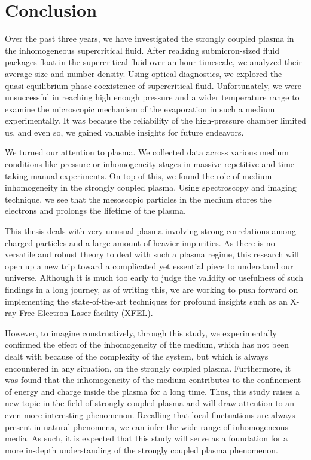 
\chapter{Conclusion}
\label{sec:ch5}

Over the past three years, we have investigated the strongly coupled plasma in the inhomogeneous supercritical fluid. After realizing submicron-sized fluid packages float in the supercritical fluid over an hour timescale, we analyzed their average size and number density. Using optical diagnostics, we explored the quasi-equilibrium phase coexistence of supercritical fluid. Unfortunately, we were unsuccessful in reaching high enough pressure and a wider temperature range to examine the microscopic mechanism of the evaporation in such a medium experimentally. It was because the reliability of the high-pressure chamber limited us, and even so, we gained valuable insights for future endeavors.

We turned our attention to plasma. We collected data across various medium conditions like pressure or inhomogeneity stages in massive repetitive and time-taking manual experiments. On top of this, we found the role of medium inhomogeneity in the strongly coupled plasma. Using spectroscopy and imaging technique, we see that the mesoscopic particles in the medium stores the electrons and prolongs the lifetime of the plasma.

This thesis deals with very unusual plasma involving strong correlations among charged particles and a large amount of heavier impurities. As there is no versatile and robust theory to deal with such a plasma regime, this research will open up a new trip toward a complicated yet essential piece to understand our universe. Although it is much too early to judge the validity or usefulness of such findings in a long journey, as of writing this, we are working to push forward on implementing the state-of-the-art techniques for profound insights such as an X-ray Free Electron Laser facility (XFEL).

However, to imagine constructively, through this study, we experimentally confirmed the effect of the inhomogeneity of the medium, which has not been dealt with because of the complexity of the system, but which is always encountered in any situation, on the strongly coupled plasma. Furthermore, it was found that the inhomogeneity of the medium contributes to the confinement of energy and charge inside the plasma for a long time. Thus, this study raises a new topic in the field of strongly coupled plasma and will draw attention to an even more interesting phenomenon. Recalling that local fluctuations are always present in natural phenomena, we can infer the wide range of inhomogeneous media. As such, it is expected that this study will serve as a foundation for a more in-depth understanding of the strongly coupled plasma phenomenon.

